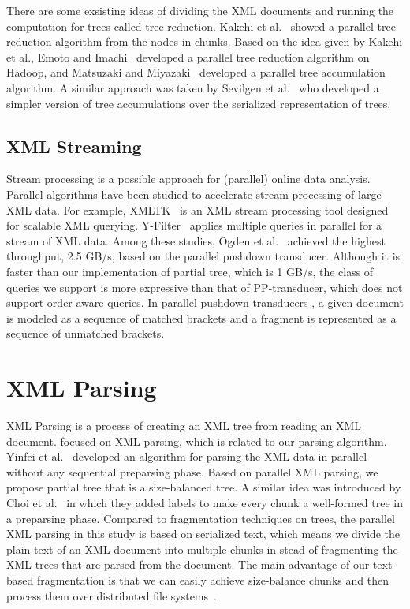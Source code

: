 There are some exsisting ideas of dividing the XML documents and running the
computation for trees called tree reduction. Kakehi et al.~\cite{KaME07} showed
a parallel tree reduction algorithm from the nodes in chunks. Based on the idea
given by Kakehi et al., Emoto and Imachi~\cite{EmIm12} developed a parallel tree
reduction algorithm on Hadoop, and Matsuzaki and Miyazaki~\cite{MaMi16}
developed a parallel tree accumulation algorithm. A similar approach was taken
by Sevilgen et al.~\cite{SAFu05} who developed a simpler version of tree
accumulations over the serialized representation of trees.

\subsection{XML Streaming}

Stream processing is a possible approach for (parallel) online data analysis.
Parallel algorithms have been studied to accelerate stream processing of large
XML data. For example, XMLTK~\cite{AGGR02} is an XML stream processing tool
designed for scalable XML querying. Y-Filter~\cite{ZhPC10} applies multiple
queries in parallel for a stream of XML data. Among these studies, Ogden et
al.~\cite{OgTP13} achieved the highest throughput, 2.5 GB/s, based on the
parallel pushdown transducer. Although it is faster than our implementation of
partial tree, which is 1 GB/s, the class of queries we support is more
expressive than that of PP-transducer, which does not support order-aware
queries. In parallel pushdown transducers \cite{LiZZ17}, a given document is
modeled as a sequence of matched brackets and a fragment is represented as a
sequence of unmatched brackets.

\section{XML Parsing}

XML Parsing is a process of creating an XML tree from reading an XML document.
\cite{PLZC07,WZYu08} focused on XML parsing, which is related to our parsing
algorithm. Yinfei et al.~\cite{PaZC08} developed an algorithm for parsing the
XML data in parallel without any sequential preparsing phase. 
Based on parallel XML parsing, we propose partial tree that is a size-balanced
tree. A similar idea was introduced by Choi et al.~\cite{ChLL14} in which they 
added labels to make every chunk a well-formed tree in a preparsing phase.
Compared to fragmentation techniques on trees, the parallel XML parsing in 
this study is based on serialized text, which means we divide the
plain text of an XML document into multiple chunks in stead of fragmenting the 
XML trees that are parsed from the document. 
The main advantage of our text-based fragmentation is that we can easily achieve
size-balance chunks and then process them over distributed file systems~\cite{dfs}. 

